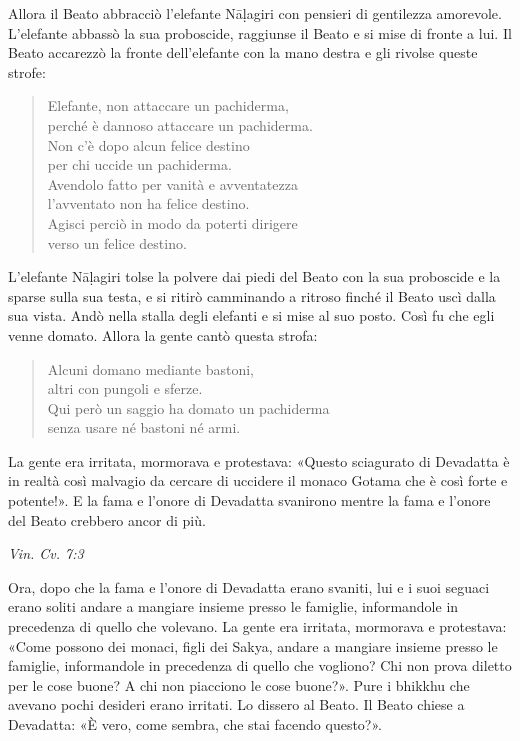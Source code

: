 Allora il Beato abbracciò l’elefante Nāḷagiri con pensieri di gentilezza
amorevole. L’elefante abbassò la sua proboscide, raggiunse il Beato e si
mise di fronte a lui. Il Beato accarezzò la fronte dell’elefante con la
mano destra e gli rivolse queste strofe:


\begin{quotation}
Elefante, non attaccare un pachiderma, \\
perché è dannoso attaccare un pachiderma. \\
Non c’è dopo alcun felice destino \\
per chi uccide un pachiderma. \\
Avendolo fatto per vanità e avventatezza \\
l’avventato non ha felice destino. \\
Agisci perciò in modo da poterti dirigere \\
verso un felice destino.
\end{quotation}

L’elefante Nāḷagiri tolse la polvere dai piedi del Beato con la sua
proboscide e la sparse sulla sua testa, e si ritirò camminando a ritroso
finché il Beato uscì dalla sua vista. Andò nella stalla degli elefanti e
si mise al suo posto. Così fu che egli venne domato. Allora la gente
cantò questa strofa:


\begin{quotation}
Alcuni domano mediante bastoni, \\
altri con pungoli e sferze. \\
Qui però un saggio ha domato un pachiderma \\
senza usare né bastoni né armi.
\end{quotation}

La gente era irritata, mormorava e protestava: «Questo sciagurato di
Devadatta è in realtà così malvagio da cercare di uccidere il monaco
Gotama che è così forte e potente!». E la fama e l’onore di Devadatta
svanirono mentre la fama e l’onore del Beato crebbero ancor di più.


\emph{Vin. Cv. 7:3}


Ora, dopo che la fama e l’onore di Devadatta erano svaniti, lui e i suoi
seguaci erano soliti andare a mangiare insieme presso le famiglie,
informandole in precedenza di quello che volevano. La gente era
irritata, mormorava e protestava: «Come possono dei monaci, figli dei
Sakya, andare a mangiare insieme presso le famiglie, informandole in
precedenza di quello che vogliono? Chi non prova diletto per le cose
buone? A chi non piacciono le cose buone?». Pure i bhikkhu che avevano
pochi desideri erano irritati. Lo dissero al Beato. Il Beato chiese a
Devadatta: «È vero, come sembra, che stai facendo questo?».


